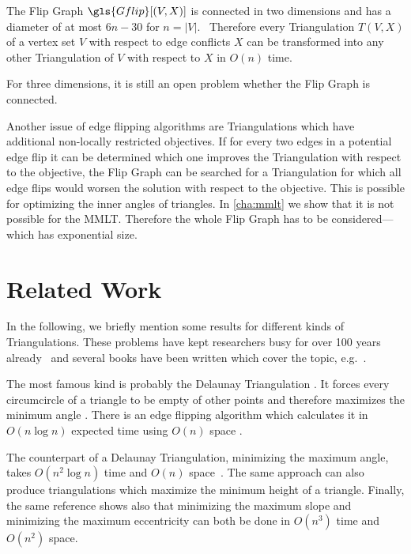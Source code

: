 \begin{theorem}
  The Flip Graph \(\gls{Gflip}[(V,X)]\) is connected in two dimensions
  \cite[Behauptung 4]{flip_graph_connected} and has a diameter of
  at most \(6n - 30\) for \(n = |V|\).~\cite{flip_graph_diameter}
  Therefore every Triangulation \(T(V,X)\) of a vertex set \(V\)
  with respect to edge conflicts \(X\) can be transformed into any
  other Triangulation of \(V\) with respect to \(X\) in \(O(n)\)
  time.
  
  For three dimensions, it is still an open problem whether
  the Flip Graph is connected.~\cite{flip_graph_3d}
\end{theorem}

Another issue of edge flipping algorithms are Triangulations
which have additional non-locally restricted objectives. If for every
two edges in a potential edge flip it can be determined which one
improves the Triangulation with respect to the objective, the Flip
Graph can be searched for a Triangulation for which all edge flips
would worsen the solution with respect to the objective. This is
possible for optimizing the inner angles of triangles. In
\cref{cha:mmlt} we show that it is not possible for the \gls{MMLT}.
Therefore the whole Flip Graph has to be considered---which has
exponential size.

\section{Related Work}
\label{sec:related_work}
In the following, we briefly mention some results for different kinds
of Triangulations. These problems have kept researchers busy
for over 100 years already~\cite{triangulation_hilbert} and several
books have been written which cover the topic,
e.g.~\cite{triangulation_book}.

The most famous kind is probably the Delaunay Triangulation
\cite[Section 9.2]{deberg_compgeom}. It forces every circumcircle
of a triangle to be empty of other points and therefore maximizes
the minimum angle \cite[Theorem 9.9]{deberg_compgeom}. There is an
edge flipping algorithm which calculates it in \(O(n \log n)\) 
expected time using \(O(n)\) space 
\cite[Theorem 9.12]{deberg_compgeom}.

The counterpart of a Delaunay Triangulation, 
minimizing the maximum angle, takes \(O(n^2 \log n)\) time and
\(O(n)\) space~\cite{triangulation_edge_insertion}. The same
approach can also produce triangulations which maximize the minimum 
height of a triangle. Finally, the same reference shows also that 
minimizing the maximum slope and minimizing the maximum eccentricity 
can both be done in \(O(n^3)\) time and \(O(n^2)\) space.

